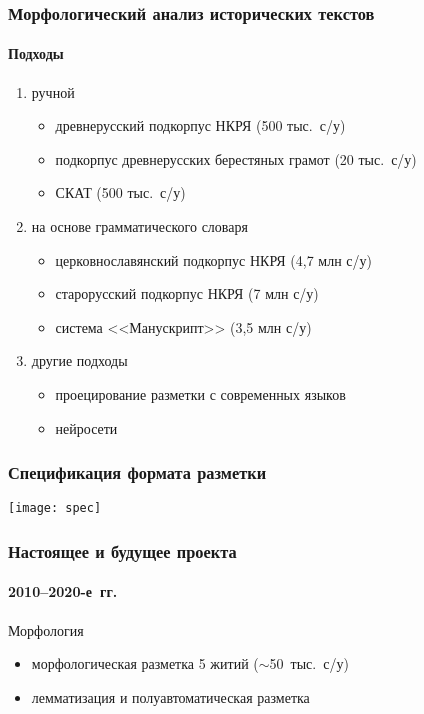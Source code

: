 \begin{frame}
  \frametitle{Морфологический анализ исторических текстов}
  \framesubtitle{Подходы}

  \begin{block}{}
    \begin{enumerate}
      \item<1-> ручной \begin{itemize}
        \item древнерусский подкорпус НКРЯ (500 тыс.\ с/у)
        \item подкорпус древнерусских берестяных грамот (20 тыс.\ с/у)
        \item \alert<4->{СКАТ} (500 тыс.\ с/у)
      \end{itemize}
      \item<2-> на основе грамматического словаря \begin{itemize}
        \item церковнославянский подкорпус НКРЯ (4,7 млн с/у)
        \item старорусский подкорпус НКРЯ (7 млн с/у)
        \item система <<Манускрипт>> (3,5 млн с/у)
      \end{itemize}
      \item<3-> другие подходы \begin{itemize}
        \item проецирование разметки с современных языков
        \item нейросети
      \end{itemize}
    \end{enumerate}
  \end{block}
\end{frame}

\begin{frame}
  \frametitle{Спецификация формата разметки}

  \begin{center}
    \texttt{[image: spec]}
  \end{center}
\end{frame}

\begin{frame}
  \frametitle{Настоящее и будущее проекта}
  \framesubtitle{2010--2020-е~гг.}

  \begin{block}{Морфология}
    \begin{itemize}
      \item морфологическая разметка 5 житий ($\sim$50~тыс.\ с/у)
      \item лемматизация и полуавтоматическая разметка\autocite{sipunin:2020}
    \end{itemize}
  \end{block}
\end{frame}

